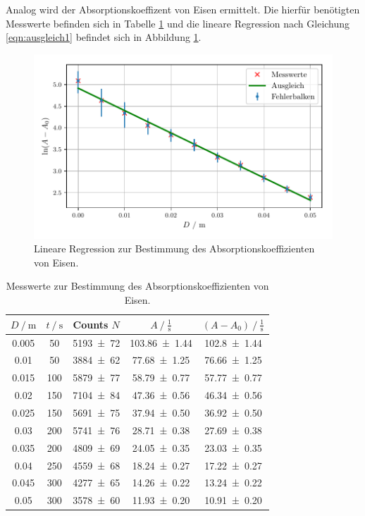 \noindent Analog wird der Absorptionskoeffizent von Eisen ermittelt. Die hierfür benötigten Messwerte befinden sich in Tabelle \ref{tab:eisen}
und die lineare Regression nach Gleichung \eqref{eqn:ausgleich1} befindet sich in Abbildung \ref{fig:eisen}.
\begin{figure}[H]
  \center
  \includegraphics[scale = 0.75]{eisen.pdf}
  \caption{Lineare Regression zur Bestimmung des Absorptionskoeffizienten von Eisen.}
  \label{fig:eisen}
\end{figure}
\begin{table}[H]
  \centering
  \caption{Messwerte zur Bestimmung des Absorptionskoeffizienten von Eisen.}
  \label{tab:eisen}
  \begin{tabular}{c c c c c}
    \toprule
$D\:/\:\si{\meter}$ & $t\:/\:\si{\second}$ & Counts $N$ & $A\:/\:\frac{1}{\si{\second}}$ & $(A-A_0)\:/\:\frac{1}{\si{\second}}$ \\
    \midrule
    0.005 & 50  & \num{5193 +- 72} & \num{103.86 +- 1.44} & \num{102.8 +- 1.44} \\
    0.01  & 50  & \num{3884 +- 62} & \num{77.68 +- 1.25} & \num{76.66 +- 1.25} \\
    0.015 & 100 & \num{5879 +- 77} & \num{58.79 +- 0.77} & \num{57.77 +- 0.77} \\
    0.02  & 150 & \num{7104 +- 84} & \num{47.36 +- 0.56} & \num{46.34 +- 0.56} \\
    0.025 & 150 & \num{5691 +- 75} & \num{37.94 +- 0.50} & \num{36.92 +- 0.50} \\
    0.03  & 200 & \num{5741 +- 76} & \num{28.71 +- 0.38} & \num{27.69 +- 0.38} \\
    0.035 & 200 & \num{4809 +- 69} & \num{24.05 +- 0.35} & \num{23.03 +- 0.35} \\
    0.04  & 250 & \num{4559 +- 68} & \num{18.24 +- 0.27} & \num{17.22 +- 0.27} \\
    0.045 & 300 & \num{4277 +- 65} & \num{14.26  +- 0.22} & \num{13.24 +- 0.22} \\
    0.05  & 300 & \num{3578 +- 60} & \num{11.93 +- 0.20} & \num{10.91 +- 0.20} \\
    \bottomrule
  \end{tabular}
\end{table}

